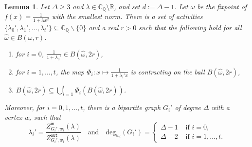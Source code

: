 \documentclass[11pt]{article}
\newtheorem{lemma}[theorem]{Lemma}
\def\Zin{Z^{\mathsf{in}}}
\def\Zout{Z^{\mathsf{out}}}
\def\Reals{\mathbb{R}}
\def\CQ{\mathbb{C}_{\mathbb{Q}}}
\begin{document}
\begin{lemma}\label{lem:perturbcontract}
Let $\Delta\geq 3$ and $\lambda\in \CQ\setminus\Reals$, and set $d:=\Delta-1$. Let $\omega$ be the fixpoint of $f(x)=\frac{1}{1+\lambda x^{d}}$ with the smallest norm. There is a set of activities $\{\lambda_0',\lambda_1',\hdots,\lambda_t'\}\subseteq \CQ\backslash\{0\}$ and a real $r>0$ such that the following hold for all $\hat{\omega}\in B(\omega,r)$. 
\begin{enumerate}
\item for $i=0$, $\frac{1}{1+\lambda_{0}'}\in B(\hat{\omega},2r)$,
\item for $i=1,\hdots,t$, the map $\Phi_i:x\mapsto \frac{1}{1+\lambda_i'x}$ is contracting on  the ball $B(\hat{\omega},2r)$,
\item $B(\hat{\omega},2r)\subseteq \bigcup^{t}_{i=1}\Phi_i(B(\hat{\omega},2r))$.
\end{enumerate}
Moreover, for $i=0,1,\hdots,t$, there is a bipartite graph $G_i'$ of degree $\Delta$ with a vertex $w_i$ such that 
\[\lambda_i'=\frac{\Zin_{G_i',w_i}(\lambda)}{\Zout_{G_i',w_i}(\lambda)}\quad\mbox{and}\quad \mathrm{deg}_{w_i}(G_i')=\begin{cases} \Delta-1 & \mbox{ if $i=0$,}\\ \Delta-2 & \mbox{ if $i=1,\hdots,t$.}\end{cases}\]
\end{lemma}
\end{document}
